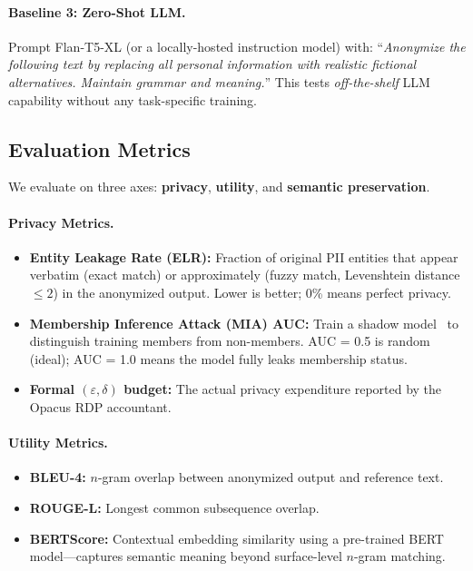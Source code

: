 \documentclass[11pt, a4paper]{article}
\begin{document}
\paragraph{Baseline 3: Zero-Shot LLM.}
Prompt Flan-T5-XL (or a locally-hosted instruction model) with:
``\textit{Anonymize the following text by replacing all personal
information with realistic fictional alternatives.  Maintain grammar
and meaning.}''  This tests \emph{off-the-shelf} LLM capability
without any task-specific training.

\subsection{Evaluation Metrics}

We evaluate on three axes: \textbf{privacy}, \textbf{utility}, and
\textbf{semantic preservation}.

\paragraph{Privacy Metrics.}
\begin{itemize}[leftmargin=*]
  \item \textbf{Entity Leakage Rate (ELR):} Fraction of original PII
        entities that appear verbatim (exact match) or approximately
        (fuzzy match, Levenshtein distance $\leq 2$) in the anonymized
        output.  Lower is better; 0\% means perfect privacy.
  \item \textbf{Membership Inference Attack (MIA) AUC:} Train a shadow
        model~\cite{shokri2017membership} to distinguish training
        members from non-members.  AUC = 0.5 is random (ideal); AUC
        = 1.0 means the model fully leaks membership status.
  \item \textbf{Formal $(\varepsilon, \delta)$ budget:} The actual
        privacy expenditure reported by the Opacus RDP accountant.
\end{itemize}

\paragraph{Utility Metrics.}
\begin{itemize}[leftmargin=*]
  \item \textbf{BLEU-4:} $n$-gram overlap between anonymized output
        and reference text.
  \item \textbf{ROUGE-L:} Longest common subsequence overlap.
  \item \textbf{BERTScore:} Contextual embedding similarity using a
        pre-trained BERT model---captures semantic meaning beyond
        surface-level $n$-gram matching.
\end{itemize}
\end{document}
